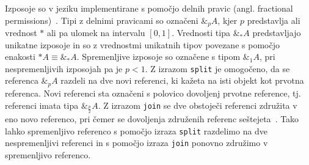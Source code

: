 Izposoje so v jeziku implementirane s pomočjo delnih pravic (angl. fractional permissions)~\cite{boyland2003checking}. Tipi z delnimi pravicami so označeni $\&_p A$, kjer $p$ predstavlja ali vrednost $*$ ali pa ulomek na intervalu $[0, 1]$. Vrednosti tipa $\&_{*} A$ predstavljajo unikatne izposoje in so z vrednostmi unikatnih tipov povezane s pomočjo enakosti $*A \equiv \&_{*} A$. Spremenljive izposoje so označene s tipom $\&_1 A$, pri nespremenljivih izposojah pa je $p < 1$. Z izrazom \texttt{split} je omogočeno, da se referenca $\&_p A$ razdeli na dve novi referenci, ki kažeta na isti objekt kot prvotna referenca. Novi referenci sta označeni s polovico dovoljenj prvotne reference, tj. referenci imata tipa $\&_{\frac{p}{2}} A$. Z izrazom \texttt{join} se dve obstoječi referenci združita v eno novo referenco, pri čemer se dovoljenja združenih referenc seštejeta~\cite{marshall2024functional}. Tako lahko spremenljivo referenco s pomočjo izraza \texttt{split} razdelimo na dve nespremenljivi referenci in s pomočjo izraza \texttt{join} ponovno združimo v spremenljivo referenco.

